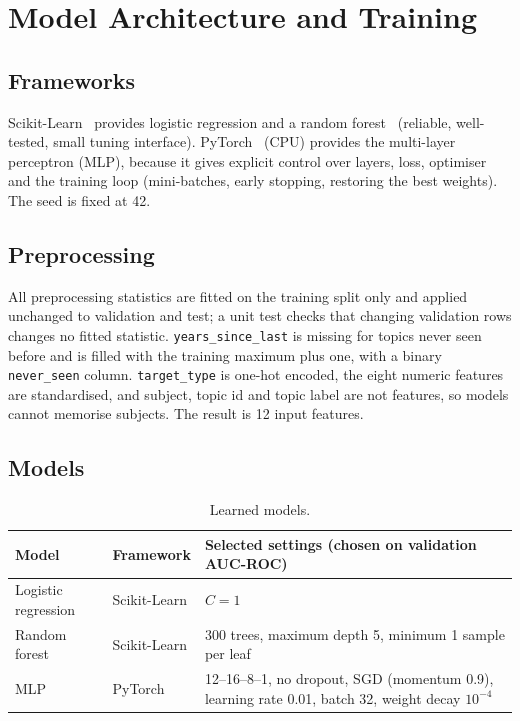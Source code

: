 \documentclass[11pt,a4paper]{article}
\begin{document}
\section{Model Architecture and Training}
\label{sec:models}

\subsection{Frameworks}
Scikit-Learn~\cite{sklearn} provides logistic regression and a random forest~\cite{rf} (reliable, well-tested, small tuning interface). PyTorch~\cite{pytorch}
(CPU) provides the multi-layer perceptron (MLP), because it gives explicit control over layers, loss, optimiser and the
training loop (mini-batches, early stopping, restoring the best weights). The seed is fixed at 42.

\subsection{Preprocessing}
All preprocessing statistics are fitted on the training split only and applied unchanged to validation and test; a unit test
checks that changing validation rows changes no fitted statistic. \texttt{years\_since\_last} is missing for topics never seen
before and is filled with the training maximum plus one, with a binary \texttt{never\_seen} column. \texttt{target\_type} is
one-hot encoded, the eight numeric features are standardised, and subject, topic id and topic label are not features, so
models cannot memorise subjects. The result is 12 input features.

\subsection{Models}
\begin{table}[!htb]
\centering
\small
\begin{tabular}{llp{7.6cm}}
\toprule
Model & Framework & Selected settings (chosen on validation AUC-ROC) \\
\midrule
Logistic regression & Scikit-Learn & $C = 1$ \\
Random forest & Scikit-Learn & 300 trees, maximum depth 5, minimum 1 sample per leaf \\
MLP & PyTorch & 12--16--8--1, no dropout, SGD (momentum 0.9), learning rate 0.01, batch 32, weight decay $10^{-4}$ \\
\bottomrule
\end{tabular}
\caption{Learned models.}
\label{tab:models}
\end{table}
\end{document}
